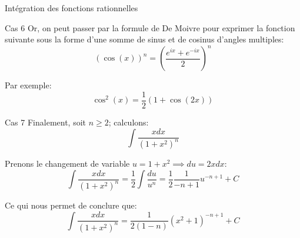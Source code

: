 \documentclass[a4paper]{article}
\begin{document}
\begin{parag}{Intégration des fonctions rationnelles}
\begin{subparag}{Cas 6}
        Or, on peut passer par la formule de De Moivre pour exprimer la fonction suivante sous la forme d'une somme de sinus et de cosinus d'angles multiples: 
        \[\left(\cos\left(x\right)\right)^n = \left(\frac{e^{ix} + e^{-ix}}{2}\right)^n\]

        Par exemple: 
        \[\cos^2\left(x\right) = \frac{1}{2}\left(1 + \cos\left(2x\right)\right)\]
    \end{subparag}

    \begin{subparag}{Cas 7}
        Finalement, soit $n \geq 2$; calculons:
        \[\int \frac{xdx}{\left(1 + x^2\right)^n}\]

        Prenons le changement de variable $u= 1 + x^2\implies du = 2x dx$:
        \[\int \frac{xdx}{\left(1 + x^2\right)^n} = \frac{1}{2} \int \frac{du}{u^n} = \frac{1}{2} \frac{1}{-n + 1} u^{-n + 1} + C\]

        Ce qui nous permet de conclure que: 
        \[\int \frac{xdx}{\left(1 + x^2\right)^n} = \frac{1}{2\left(1 - n\right)} \left(x^2 + 1\right)^{-n + 1} + C\]
    \end{subparag}

\end{parag}
\end{document}

